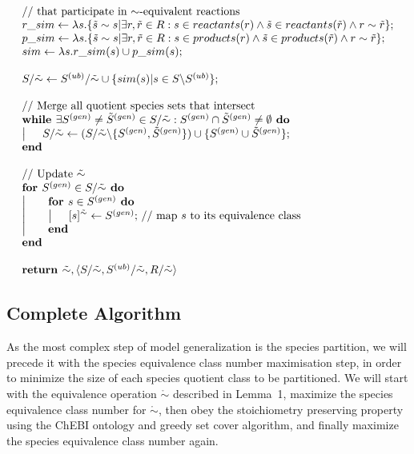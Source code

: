 \documentclass[9pt]{article}
\begin{document}
\[\begin{array}{l}
\mbox{// that participate in $\sim$-equivalent reactions}\\
\mbox{$r\_sim \leftarrow \lambda{s}.\{\tilde{s}\sim{s}|\exists r,\tilde{r}\in{R}: s\in reactants(r) \land \tilde{s}\in reactants(\tilde{r}) \land r \sim \tilde{r}\};$}\\
\mbox{$p\_sim \leftarrow \lambda{s}.\{\tilde{s}\sim{s}|\exists r,\tilde{r}\in{R}: s\in products(r) \land \tilde{s}\in products(\tilde{r}) \land r \sim \tilde{r}\};$}\\
\mbox{$sim \leftarrow \lambda{s}.r\_sim(s)\cup p\_sim(s);$}\\
\mbox{~}\\
\mbox{$S/\tilde{\sim} \leftarrow S^{(ub)}/\tilde{\sim} \cup \{sim(s)|s \in S\backslash S^{(ub)}\};$}\\
\mbox{~}\\
\mbox{// Merge all quotient species sets that intersect}\\
\mbox{\textbf{while }$\exists S^{(gen)} \neq \tilde{S}^{(gen)} \in S/\tilde{\sim}: S^{(gen)} \cap \tilde{S}^{(gen)} \neq \emptyset$\textbf{ do}}\\
\left| \indent\mbox{$S/\tilde{\sim} \leftarrow (S/\tilde{\sim}\backslash{\{S^{(gen)}, \tilde{S}^{(gen)}\}})\cup\{S^{(gen)}\cup \tilde{S}^{(gen)}\};$}\right. \\
\mbox{\textbf{end}}\\
\mbox{~}\\
\mbox{// Update $\tilde{\sim}$}\\
\mbox{\textbf{for }$S^{(gen)}\in{S/\tilde{\sim}}$\textbf{ do}}\\
\left| \indent \begin{array}{l}
\mbox{\textbf{for }$s \in S^{(gen)}$\textbf{ do}}\\
\left| \indent\mbox{$[s]^{\tilde{\sim}} \leftarrow S^{(gen)};$ // map $s$ to its equivalence class}\right. \\
\mbox{\textbf{end}}
\end{array}\right. \\
\mbox{\textbf{end}}\\
\mbox{~}\\
\mbox{\textbf{return }$\tilde{\sim}, \langle S/\tilde{\sim}, S^{(ub)}/\tilde{\sim}, R/\tilde{\sim} \rangle$}
\end{array} \]

\subsection*{Complete Algorithm}
As the most complex step of model generalization is the species partition, we will precede it with the species equivalence class number maximisation step, in order to minimize the size of each species quotient class to be partitioned. We will start with the equivalence operation $\mathring{\sim}$ described in Lemma~1, maximize the species equivalence class number for $\mathring{\sim}$, then obey the stoichiometry preserving property using the ChEBI ontology and greedy set cover algorithm, and finally maximize the species equivalence class number again.\\
\end{document}
